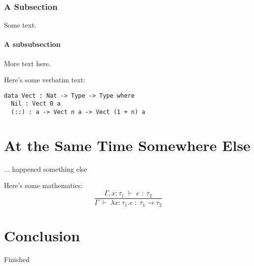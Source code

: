\documentclass{ituthesis}
\begin{document}
\subsection{A Subsection}
Some text.
\subsubsection{A subsubsection}
More text here.

Here's some verbatim text:
\begin{verbatim}
data Vect : Nat -> Type -> Type where
  Nil : Vect 0 a
  (::) : a -> Vect n a -> Vect (1 + n) a
\end{verbatim}

\chapter{At the Same Time Somewhere Else}
... happened something else

Here's some mathematics:
\begin{displaymath}
  \frac{
    \Gamma, x:\tau_1\;\vdash\; e \;:\; \tau_2
  }{
    \Gamma\;\vdash\;\lambda x : \tau_1 . e \;:\; \tau_1\to\tau_2}
\end{displaymath}

\chapter{Conclusion}
Finished
\end{document}
